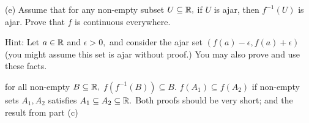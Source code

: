 \documentclass{article}
\begin{document}
\newpage

\begin{problem*}[Problem 4e]
    (e) Assume that for any non-empty subset $U \subseteq \mathbb R,$ if $U$ is ajar, then $f^{-1}(U)$ is ajar.
    Prove that $f$ is continuous everywhere. 

    Hint: Let $a\in \mathbb R$ and $\epsilon >0,$ and consider the ajar set $(f(a) - \epsilon, f(a) + \epsilon)$ 
    (you might assume this set is ajar without proof.) You may also prove and use these facts.
    \begin{enumerate}[topsep=0pt, partopsep=0pt, itemsep=0pt]
        \ii for all non-empty $B \subseteq \mathbb R,$ $f(f^{-1}(B)) \subseteq B.$
        \ii $f(A_1) \subseteq f(A_2)$ if non-empty sets $A_1, A_2$ satisfies $A_1 \subseteq A_2 \subseteq \mathbb R.$ Both proofs should be very short; and
        \ii the result from part (c)
    \end{enumerate}
\end{problem*}
\end{document}
